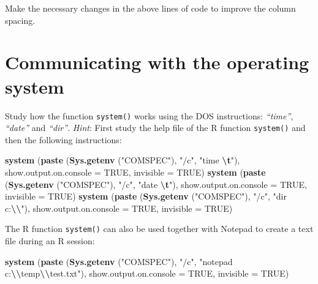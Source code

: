 \documentclass[
]{book}
\newenvironment{Shaded}{\begin{snugshade}}{\end{snugshade}}
\newcommand{\AttributeTok}[1]{\textcolor[rgb]{0.13,0.29,0.53}{#1}}
\newcommand{\ConstantTok}[1]{\textcolor[rgb]{0.56,0.35,0.01}{#1}}
\newcommand{\FunctionTok}[1]{\textcolor[rgb]{0.13,0.29,0.53}{\textbf{#1}}}
\newcommand{\NormalTok}[1]{#1}
\newcommand{\SpecialCharTok}[1]{\textcolor[rgb]{0.81,0.36,0.00}{\textbf{#1}}}
\newcommand{\StringTok}[1]{\textcolor[rgb]{0.31,0.60,0.02}{#1}}
\begin{document}
Make the necessary changes in the above lines of code to improve the column spacing.

\section{Communicating with the operating system}\label{communicating-with-the-operating-system}

Study how the function \texttt{system()} works using the DOS instructions: \emph{``time''}, \emph{``date''} and \emph{``dir''}. \emph{Hint}: First study the help file of the R function \texttt{system()} and then the following instructions:

\begin{Shaded}
\begin{Highlighting}[]
\FunctionTok{system}\NormalTok{ (}\FunctionTok{paste}\NormalTok{ (}\FunctionTok{Sys.getenv}\NormalTok{ (}\StringTok{"COMSPEC"}\NormalTok{), }\StringTok{"/c"}\NormalTok{, }\StringTok{"time }\SpecialCharTok{\textbackslash{}t}\StringTok{"}\NormalTok{),                      }
         \AttributeTok{show.output.on.console =} \ConstantTok{TRUE}\NormalTok{, }\AttributeTok{invisible =} \ConstantTok{TRUE}\NormalTok{)}
\FunctionTok{system}\NormalTok{ (}\FunctionTok{paste}\NormalTok{ (}\FunctionTok{Sys.getenv}\NormalTok{ (}\StringTok{"COMSPEC"}\NormalTok{), }\StringTok{"/c"}\NormalTok{, }\StringTok{"date }\SpecialCharTok{\textbackslash{}t}\StringTok{"}\NormalTok{),                  }
         \AttributeTok{show.output.on.console =} \ConstantTok{TRUE}\NormalTok{, }\AttributeTok{invisible =} \ConstantTok{TRUE}\NormalTok{)}
\FunctionTok{system}\NormalTok{ (}\FunctionTok{paste}\NormalTok{ (}\FunctionTok{Sys.getenv}\NormalTok{ (}\StringTok{"COMSPEC"}\NormalTok{), }\StringTok{"/c"}\NormalTok{, }\StringTok{"dir c:}\SpecialCharTok{\textbackslash{}\textbackslash{}}\StringTok{"}\NormalTok{),                  }
         \AttributeTok{show.output.on.console =} \ConstantTok{TRUE}\NormalTok{, }\AttributeTok{invisible =} \ConstantTok{TRUE}\NormalTok{)}
\end{Highlighting}
\end{Shaded}

The R function \texttt{system()} can also be used together with Notepad to create a text file during an R session:

\begin{Shaded}
\begin{Highlighting}[]
\FunctionTok{system}\NormalTok{ (}\FunctionTok{paste}\NormalTok{ (}\FunctionTok{Sys.getenv}\NormalTok{ (}\StringTok{"COMSPEC"}\NormalTok{), }\StringTok{"/c"}\NormalTok{, }
               \StringTok{"notepad c:}\SpecialCharTok{\textbackslash{}\textbackslash{}}\StringTok{temp}\SpecialCharTok{\textbackslash{}\textbackslash{}}\StringTok{test.txt"}\NormalTok{),}
        \AttributeTok{show.output.on.console =} \ConstantTok{TRUE}\NormalTok{, }\AttributeTok{invisible =} \ConstantTok{TRUE}\NormalTok{)}
\end{Highlighting}
\end{Shaded}
\end{document}
